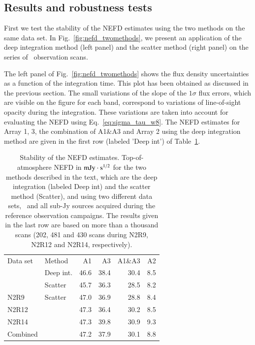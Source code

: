 \subsection{Results and robustness tests}
\label{se:nefd_results}

First we test the stability of the NEFD estimates using the two
methods on the same data set. In Fig.~\ref{fig:nefd_twomethods}, we
present an application of the deep integration method (left panel) and
the scatter method (right panel) on
the series of \hls\ observation scans.

The left panel of Fig.~\ref{fig:nefd_twomethods} shows the flux density
uncertainties as a function of the integration time. This plot has
been obtained as discussed in the previous section. The small
variations of the slope of the $1\sigma$ flux errors, which are
visible on the figure for each band, correspond to variations of line-of-sight opacity
during the integration. These variations are taken into account for
evaluating the NEFD using Eq.~\ref{eq:sigma_tau_w8}. The NEFD estimates for Array 1, 3, the
combination of A1$\&$A3 and Array 2 using the deep  
integration method are given in the first row (labeled 'Deep int') of
Table~\ref{tab:nefd_summary}. 
 
\begin{table}[!htbp]
  \centering
  \caption[]{Stability of the NEFD estimates. Top-of-atmosphere NEFD
    in $\rm{mJy}\cdot s^{1/2}$ for the two methods described in the text, which
  are the deep integration (labeled Deep int) and the scatter method
  (Scatter), and using two different data sets, \hls\
  and all sub-Jy sources acquired during the reference observation
  campaigns. The results given in the last row are based on more than a thousand
  scans (202, 481 and 430 scans during N2R9, N2R12 and N2R14, respectively).}
  \label{tab:nefd_summary}
  \begin{tabular}{llrrrr}
    \hline\hline
    \noalign{\smallskip}
    Data set   & Method   & A1      &   A3    &   A1\&A3 &    A2 \\
    \noalign{\smallskip}
    \hline
    \noalign{\smallskip}
    \hls &     Deep int.  &  46.6  &    38.4  &    30.4  &   8.5  \\
         &     Scatter    &  45.7  &    36.3  &    28.5  &   8.2  \\
    \hline
    \noalign{\smallskip}
    N2R9     & Scatter    & 47.0 &  36.9  & 28.8  & 8.4 \\
    N2R12    &            & 47.3 &  36.4  & 30.2  & 8.5 \\
    N2R14    &            & 47.3 &  39.8  & 30.9  & 9.3 \\
    Combined &            & 47.2 &  37.9  & 30.1  & 8.8 \\
    \hline
  \end{tabular}
\end{table}

